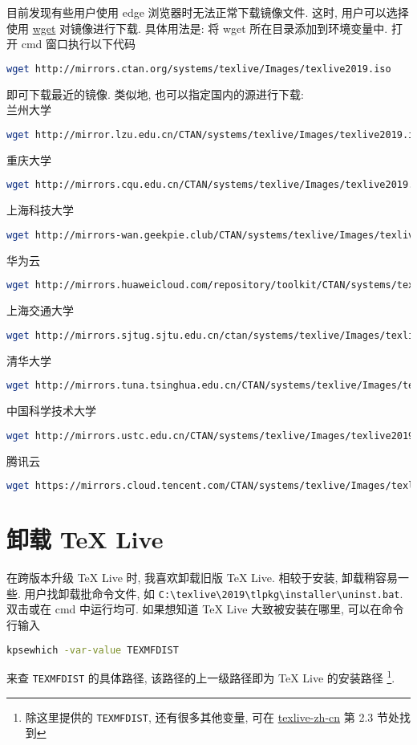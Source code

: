 \documentclass{ctexrep}
\begin{document}
目前发现有些用户使用 \textsf{edge} 浏览器时无法正常下载镜像文件.
这时,
用户可以选择使用 \href{https://eternallybored.org/misc/wget/}{wget} 对镜像进行下载.
具体用法是:
将 \textsf{wget} 所在目录添加到环境变量中.
打开 \textsf{cmd} 窗口执行以下代码
\begin{lstlisting}[language = bash]
  wget http://mirrors.ctan.org/systems/texlive/Images/texlive2019.iso
\end{lstlisting}
即可下载最近的镜像.
类似地,
也可以指定国内的源进行下载:\\
兰州大学
\begin{lstlisting}[language = bash]
  wget http://mirror.lzu.edu.cn/CTAN/systems/texlive/Images/texlive2019.iso
\end{lstlisting}
重庆大学
\begin{lstlisting}[language = bash]
  wget http://mirrors.cqu.edu.cn/CTAN/systems/texlive/Images/texlive2019.iso
\end{lstlisting}
上海科技大学
\begin{lstlisting}[language = bash]
  wget http://mirrors-wan.geekpie.club/CTAN/systems/texlive/Images/texlive2019.iso
\end{lstlisting}
华为云
\begin{lstlisting}[language = bash]
  wget http://mirrors.huaweicloud.com/repository/toolkit/CTAN/systems/texlive/Images/texlive2019.iso
\end{lstlisting}
上海交通大学
\begin{lstlisting}[language = bash]
  wget http://mirrors.sjtug.sjtu.edu.cn/ctan/systems/texlive/Images/texlive2019.iso
\end{lstlisting}
清华大学
\begin{lstlisting}[language = bash]
  wget http://mirrors.tuna.tsinghua.edu.cn/CTAN/systems/texlive/Images/texlive2019.iso
\end{lstlisting}
中国科学技术大学
\begin{lstlisting}[language = bash]
  wget http://mirrors.ustc.edu.cn/CTAN/systems/texlive/Images/texlive2019.iso
\end{lstlisting}
腾讯云
\begin{lstlisting}[language = bash]
  wget https://mirrors.cloud.tencent.com/CTAN/systems/texlive/Images/texlive2019.iso
\end{lstlisting}

\section{卸载 \TeX{} Live}
在跨版本升级 \TeX{} Live 时, 我喜欢卸载旧版 \TeX{} Live. 
相较于安装, 卸载稍容易一些. 
用户找卸载批命令文件, 如 \texttt{C:\textbackslash texlive\textbackslash 2019\textbackslash tlpkg\textbackslash installer\textbackslash uninst.bat}. 
双击或在 \textsf{cmd} 中运行均可.
如果想知道 \TeX{} Live 大致被安装在哪里,
可以在命令行输入
\begin{lstlisting}[language=bash]
  kpsewhich -var-value TEXMFDIST
\end{lstlisting}
来查 \texttt{TEXMFDIST} 的具体路径,
该路径的上一级路径即为 \TeX{} Live 的安装路径%
\footnote{%
  除这里提供的 \texttt{TEXMFDIST}, 还有很多其他变量, 可在
  \href{https://www.tug.org/texlive/doc/texlive-zh-cn/texlive-zh-cn.pdf}{texlive-zh-cn}
  第 2.3 节处找到
}.
\end{document}
